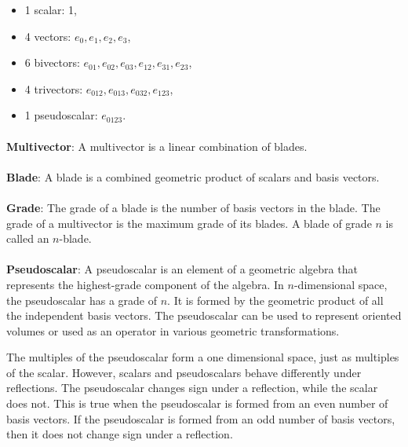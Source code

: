 \documentclass{article}
\begin{document}
\begin{itemize}
\item 1 scalar: 1,
\item 4 vectors: $e_0, e_1, e_2, e_3$,
\item 6 bivectors: $e_{01}, e_{02}, e_{03}, e_{12}, e_{31}, e_{23}$,
\item 4 trivectors: $e_{012}, e_{013}, e_{032}, e_{123}$,
\item 1 pseudoscalar: $e_{0123}$.
\end{itemize}

\paragraph{}\textbf{Multivector}: A multivector is a linear combination of blades.

\paragraph{}\textbf{Blade}: A blade is a combined geometric product of scalars and basis vectors.

\paragraph{}\textbf{Grade}: The grade of a blade is the number of basis vectors in the blade. 
The grade of a multivector is the maximum grade of its blades. A blade of grade $n$ is called an $n$-blade.

\paragraph{}\textbf{Pseudoscalar}: A pseudoscalar is an element of a geometric algebra that represents the 
highest-grade component of the algebra. In $n$-dimensional space, the pseudoscalar has a grade of $n$. It is 
formed by the geometric product of all the independent basis vectors. The pseudoscalar can be used to 
represent oriented volumes or used as an operator in various geometric transformations.

The multiples of the pseudoscalar form a one dimensional space, just as multiples of the scalar. However, 
scalars and pseudoscalars behave differently under reflections. The pseudoscalar changes sign under a
reflection, while the scalar does not. This is true when the pseudoscalar is formed from an even number of
basis vectors. If the pseudoscalar is formed from an odd number of basis vectors, then it does not change
sign under a reflection.
\end{document}
